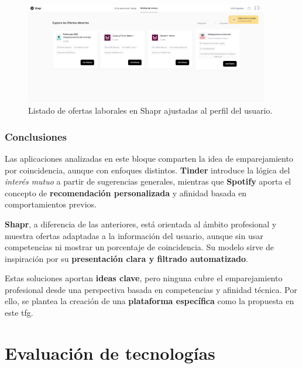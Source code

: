 \begin{figure}[H]
    \centering
    \includegraphics[width=0.95\textwidth]{figs/shapr-ofertas.png}
    \caption{Listado de ofertas laborales en Shapr ajustadas al perfil del usuario.}
    \label{fig:shapr-ofertas}
\end{figure}

\subsubsection{Conclusiones}

Las aplicaciones analizadas en este bloque comparten la idea de emparejamiento por
coincidencia, aunque con enfoques distintos. \textbf{Tinder} introduce la lógica del
\textit{interés mutuo} a partir de sugerencias generales, mientras que \textbf{Spotify}
aporta el concepto de \textbf{recomendación personalizada} y afinidad basada en
comportamientos previos.

\textbf{Shapr}, a diferencia de las anteriores, está orientada al ámbito profesional y
muestra ofertas adaptadas a la información del usuario, aunque sin usar competencias ni
mostrar un porcentaje de coincidencia. Su modelo sirve de inspiración por su
\textbf{presentación clara y filtrado automatizado}.

Estas soluciones aportan \textbf{ideas clave}, pero ninguna cubre el emparejamiento
profesional desde una perspectiva basada en competencias y afinidad técnica. Por ello, se
plantea la creación de una \textbf{plataforma específica} como la propuesta en este
\gls{tfg}.

\section{Evaluación de tecnologías}\label{sec:evaluacion-tecnologias}
